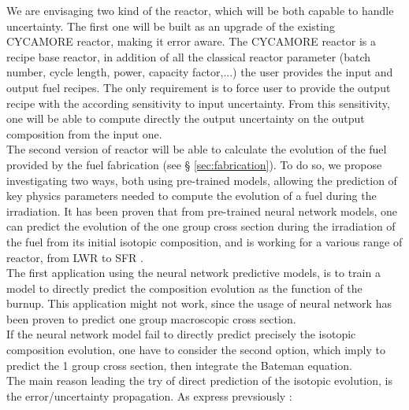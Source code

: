 \documentclass[dvips,12pt]{article}
\begin{document}
We are envisaging two kind of the reactor, which
will be both capable to handle uncertainty. The
first one will be built as an upgrade of the
existing CYCAMORE reactor, making it error
aware. The CYCAMORE reactor is a recipe base
reactor, in addition of all the classical reactor
parameter (batch number, cycle length, power,
capacity factor,...) the user provides the input
and output fuel recipes. The only requirement is
to force user to provide the output recipe with
the according sensitivity to input
uncertainty. From this sensitivity, one will be
able to compute directly the output uncertainty on
the output composition from the input one.\\


The second version of reactor will be able to
calculate the evolution of the fuel provided by
the fuel fabrication (see \S
\ref{sec:fabrication}).  To do so, we propose
investigating two ways, both using pre-trained
models, allowing the prediction of key physics
parameters needed to compute the evolution of a
fuel during the irradiation. It has been proven
that from pre-trained neural network models, one
can predict the evolution of the one group cross
section during the irradiation of the fuel from
its initial isotopic composition, and is working
for a various range of reactor, from LWR to SFR
\cite{Leniau Neural networks,
  Leniau.PHYSOR.2016}.\\ 
The first application using the neural network
predictive models, is to train a model to directly
predict the composition evolution as the function
of the burnup. This application might not work,
since the usage of neural network has been proven
to predict one group macroscopic cross
section.\\ 
If the neural network model fail to directly
predict precisely the isotopic composition
evolution, one have to consider the second option,
which imply to predict the 1 group cross section,
then integrate the Bateman equation.\\

The main reason leading the try of direct
prediction of the isotopic evolution, is the
error/uncertainty propagation. As express
prevsiously :
\end{document}
